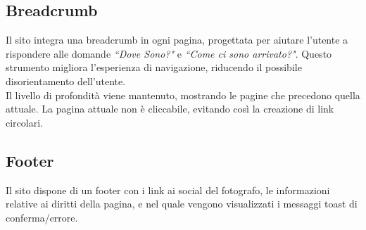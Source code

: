 \subsection{Breadcrumb}
Il sito integra una breadcrumb in ogni pagina, progettata per aiutare l'utente a rispondere alle domande  \textit{``Dove Sono?"} e \textit{``Come ci sono arrivato?"}. Questo strumento migliora l'esperienza di navigazione, riducendo il possibile disorientamento dell'utente.\\
Il livello di profondità viene mantenuto, mostrando le pagine che precedono quella attuale. La pagina attuale non è cliccabile, evitando così la creazione di link circolari.

\subsection{Footer}
Il sito dispone di un footer con i link ai social del fotografo, le informazioni relative ai diritti della pagina, 
e nel quale vengono visualizzati i messaggi toast di conferma/errore.